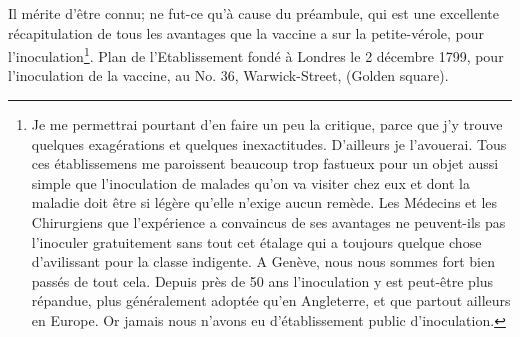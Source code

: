 Il mérite d'être connu; ne fut-ce qu'à cause du préambule, qui est une excellente récapitulation de tous les avantages que la vaccine a sur la petite-vérole, pour l'inoculation\footnote{Je me permettrai pourtant d'en faire un peu la critique, parce que j'y trouve quelques exagérations et quelques inexactitudes. D'ailleurs je l'avouerai. Tous ces établissemens me paroissent beaucoup trop fastueux pour un objet aussi simple que l'inoculation de malades qu'on va visiter chez eux et dont la maladie doit être si légère qu'elle n'exige aucun remède. Les Médecins et les Chirurgiens que l'expérience a convaincus de ses avantages ne peuvent-ils pas l'inoculer gratuitement sans tout cet étalage qui a toujours quelque chose d'avilissant pour la classe indigente. A Genève, nous nous sommes fort bien passés de tout cela. Depuis près de 50 ans l'inoculation y est peut-être plus répandue, plus généralement adoptée qu'en Angleterre, et que partout ailleurs en Europe. Or jamais nous n'avons eu d'établissement public d'inoculation.}.
\setcounter{page}{264}
Plan de l'Etablissement fondé à Londres le 2 décembre 1799, pour l'inoculation de la vaccine, au No. 36, Warwick-Street, (Golden square).
